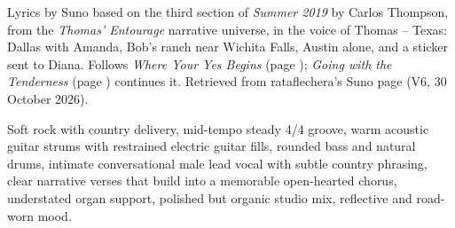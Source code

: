 
\label{sec:just-the-road}
\begin{notes}
Lyrics by Suno based on the third section of \emph{Summer 2019} by Carlos Thompson, from the \emph{Thomas' Entourage} narrative universe, in the voice of Thomas -- Texas: Dallas with Amanda, Bob's ranch near Wichita Falls, Austin alone, and a sticker sent to Diana. Follows \emph{Where Your Yes Begins} (page \pageref{sec:where-your-yes-begins}); \emph{Going with the Tenderness} (page \pageref{sec:going-with-the-tenderness}) continues it. Retrieved from rataflechera's Suno page (V6, 30 October 2026).
\end{notes}
\begin{style}
Soft rock with country delivery, mid-tempo steady 4/4 groove, warm acoustic guitar strums with restrained electric guitar fills, rounded bass and natural drums, intimate conversational male lead vocal with subtle country phrasing, clear narrative verses that build into a memorable open-hearted chorus, understated organ support, polished but organic studio mix, reflective and road-worn mood.
\end{style}
